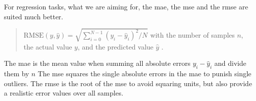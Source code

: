 For regression tasks, what we are aiming for, the \gls{mae}, the \gls{mse} and the \gls{rmse} are suited much better.

\begin{quote}
\begin{math}
\text{RMSE}(y, \hat{y}) = \sqrt{\sum_{i=0}^{N - 1} (y_i - \hat{y}_i)^2 / N }
\end{math}\newline
with the number of samples $n$, the actual value $y$, and the predicted value $\hat{y}$ \cite{MAE_RMSE}.
\end{quote}

The \gls{mae} is the mean value when summing all absolute errors $y_i - \hat{y}_i$ and divide them by $n$
The \gls{mse} squares the single absolute errors in the \gls{mae} to punish single outliers.
The \gls{rmse} is the root of the \gls{mse} to avoid squaring units, but also provide a realistic error values over all samples.

